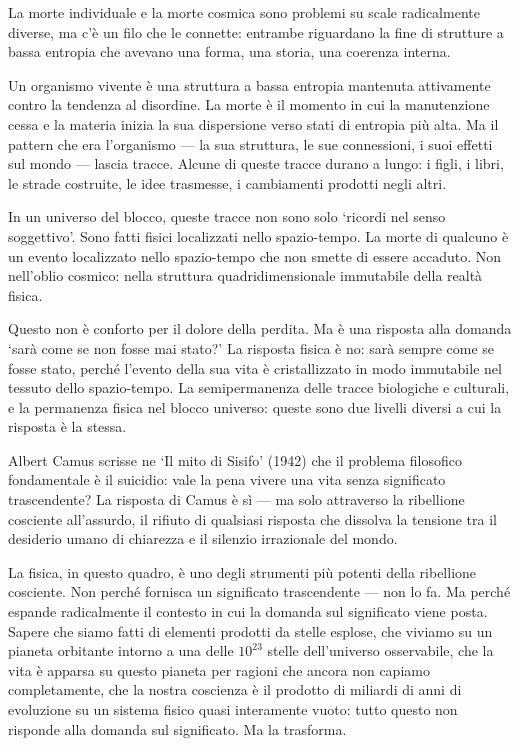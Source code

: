 \documentclass[12pt,a4paper,openany]{book}
\newcommand{\sezione}[1]{\vspace{1.2em}{\large\bfseries #1}\vspace{0.5em}\par}
\begin{document}
\sezione{La morte come problema di scala}

La morte individuale e la morte cosmica sono problemi su scale radicalmente diverse, ma c'è un filo che le connette: entrambe riguardano la fine di strutture a bassa entropia che avevano una forma, una storia, una coerenza interna.

Un organismo vivente è una struttura a bassa entropia mantenuta attivamente contro la tendenza al disordine. La morte è il momento in cui la manutenzione cessa e la materia inizia la sua dispersione verso stati di entropia più alta. Ma il pattern che era l'organismo --- la sua struttura, le sue connessioni, i suoi effetti sul mondo --- lascia tracce. Alcune di queste tracce durano a lungo: i figli, i libri, le strade costruite, le idee trasmesse, i cambiamenti prodotti negli altri.

In un universo del blocco, queste tracce non sono solo `ricordi nel senso soggettivo'. Sono fatti fisici localizzati nello spazio-tempo. La morte di qualcuno è un evento localizzato nello spazio-tempo che non smette di essere accaduto. Non nell'oblio cosmico: nella struttura quadridimensionale immutabile della realtà fisica.

Questo non è conforto per il dolore della perdita. Ma è una risposta alla domanda `sarà come se non fosse mai stato?' La risposta fisica è no: sarà sempre come se fosse stato, perché l'evento della sua vita è cristallizzato in modo immutabile nel tessuto dello spazio-tempo. La semipermanenza delle tracce biologiche e culturali, e la permanenza fisica nel blocco universo: queste sono due livelli diversi a cui la risposta è la stessa.

\sezione{Il problema del significato: Camus, la fisica e l'assurdo}

Albert Camus scrisse ne `Il mito di Sisifo' (1942) che il problema filosofico fondamentale è il suicidio: vale la pena vivere una vita senza significato trascendente? La risposta di Camus è sì --- ma solo attraverso la ribellione cosciente all'assurdo, il rifiuto di qualsiasi risposta che dissolva la tensione tra il desiderio umano di chiarezza e il silenzio irrazionale del mondo.

La fisica, in questo quadro, è uno degli strumenti più potenti della ribellione cosciente. Non perché fornisca un significato trascendente --- non lo fa. Ma perché espande radicalmente il contesto in cui la domanda sul significato viene posta. Sapere che siamo fatti di elementi prodotti da stelle esplose, che viviamo su un pianeta orbitante intorno a una delle $10^{23}$ stelle dell'universo osservabile, che la vita è apparsa su questo pianeta per ragioni che ancora non capiamo completamente, che la nostra coscienza è il prodotto di miliardi di anni di evoluzione su un sistema fisico quasi interamente vuoto: tutto questo non risponde alla domanda sul significato. Ma la trasforma.
\end{document}
